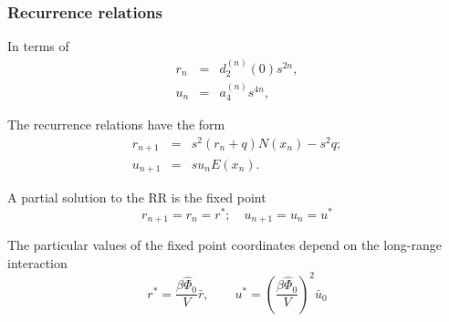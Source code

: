 \documentclass[8pt]{beamer}
\begin{document}
	\begin{frame}
		\frametitle{Recurrence relations}
		
		In terms of
		\begin{eqnarray*}
			r_n & = & d_2^{(n)}(0)s^{2n},
			\\
			u_n & = & a_4^{(n)}s^{4n},
		\end{eqnarray*}
		
		The recurrence relations have the form
		\begin{eqnarray*}
			r_{n+1} & = & s^2(r_n + q) N(x_n) - s^2 q;
			\nonumber\\
			u_{n+1} & = & s u_n E(x_n).
		\end{eqnarray*}
		
		A partial solution to the RR is the fixed point
		\begin{equation*}
			r_{n+1} = r_n = r^*; \quad u_{n+1} = u_n = u^*
		\end{equation*}
		
		The particular values of the fixed point coordinates depend on the long-range interaction
		\begin{equation*}
			r^* = \frac{\beta\hat{\Phi}_0}{V} \bar{r}, 
			\qquad 
			u^* = \left(\frac{\beta\hat{\Phi}_0}{V}\right)^2 \bar{u}_0
		\end{equation*}
	\end{frame}
	
\end{document}
